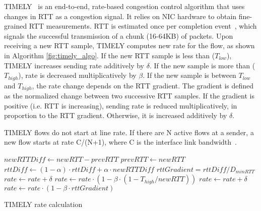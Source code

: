 TIMELY~\cite{timely} is an end-to-end, rate-based congestion control algorithm
that uses changes in RTT as a congestion signal.  It relies on NIC hardware to
obtain fine-grained RTT measurements. RTT is estimated once per completion
event~\cite{rocev2}, which signals the successful transmission of a chunk
(16-64KB) of packets. Upon receiving a new RTT sample, TIMELY computes new rate
for the flow, as shown in Algorithm \ref{fig:timely_algo}.  If the new RTT
sample is less than ($T_{low}$), TIMELY increases sending rate additively by
$\delta$. If the new sample is more than ($T_{high}$), rate is decreased
multiplicatively by $\beta$. If the new sample is between $T_{low}$ and
$T_{high}$, the rate change depends on the RTT gradient. The gradient is defined
as the normalized change between two successive RTT samples. If the gradient is
positive (i.e. RTT is increasing), sending rate is reduced multiplicatively, in
proportion to the RTT gradient.  Otherwise, it is increased additively by
$\delta$.

TIMELY flows do not start at line rate. If there are N active flows at a sender,
a new flow starts at rate C/(N+1), where C is the interface link
bandwidth~\cite{timely}.

\begin{algorithm}[t]
\footnotesize
{
\begin{algorithmic}[1]
\State $newRTTDiff \gets newRTT - prevRTT$
\State $prevRTT \gets newRTT$
\State $rttDiff \gets (1-\alpha) \cdot rttDiff + \alpha \cdot newRTTDiff$
\State $rttGradient = rttDiff/D_{minRTT}$
        \State $rate \gets rate + \delta$
        \State $rate \gets rate \cdot  (1 - \beta \cdot (1 - T_{high}/newRTT))$
        \State $rate \gets rate + \delta$
\Else
        \State $rate \gets rate \cdot (1 - \beta \cdot rttGradient)$
\EndIf 
\end{algorithmic}
}
\caption{TIMELY rate calculation}
\label{fig:timely_algo}
\end{algorithm}
